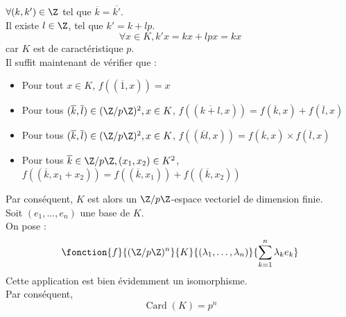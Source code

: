 \documentclass[8pt]{book}
\begin{document}
\begin{enumerate}[leftmargin=*]
		$\forall (k,k')\in\Z$ tel que $\overline{k}=\overline{k'}$.\\ Il existe $l\in\Z$, tel que $k'=k+lp$.
		\[\forall x\in K, k'x=kx+lpx=kx\]
		car $K$ est de caractéristique $p$.\\
		Il suffit maintenant de vérifier que : 
		\begin{itemize}
			\item Pour tout $x\in K$, $f((\overline{1},x))=x$
			\item Pour tous $(\overline{k},\overline{l})\in(\Z/p\Z)^2, x\in K$, $f((\overline{k+l},x))=f(\overline{k},x)+f(\overline{l},x)$
			\item Pour tous $(\overline{k},\overline{l})\in(\Z/p\Z)^2, x\in K$, $f((\overline{kl},x))=f(\overline{k},x)\times f(\overline{l},x)$
			\item Pour tous $\overline{k}\in\Z/p\Z, (x_1,x_2)\in K^2$, $f((\overline{k},x_1+x_2))=f((\overline{k},x_1))+f((\overline{k},x_2))$
		\end{itemize}
		Par conséquent, $K$ est alors un $\Z/p\Z$-espace vectoriel de dimension finie.\\
		Soit $(e_1,\dots,e_n)$ une base de $K$.\\
		On pose : \[\fonction{f}{(\Z/p\Z)^n}{K}{(\lambda_1,\dots,\lambda_n)}{\displaystyle\sum_{k=1}^{n}\lambda_k e_k}\]
		Cette application est bien évidemment un isomorphisme.\\
		Par conséquent, \[\operatorname{Card}(K)=p^n\]
		
	\end{enumerate}
	
\end{document}
